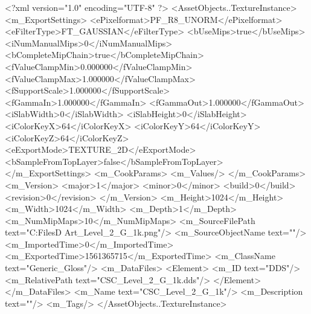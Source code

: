 <?xml version="1.0" encoding="UTF-8" ?>
<AssetObjects..TextureInstance>
	<m_ExportSettings>
		<ePixelformat>PF_R8_UNORM</ePixelformat>
		<eFilterType>FT_GAUSSIAN</eFilterType>
		<bUseMips>true</bUseMips>
		<iNumManualMips>0</iNumManualMips>
		<bCompleteMipChain>true</bCompleteMipChain>
		<fValueClampMin>0.000000</fValueClampMin>
		<fValueClampMax>1.000000</fValueClampMax>
		<fSupportScale>1.000000</fSupportScale>
		<fGammaIn>1.000000</fGammaIn>
		<fGammaOut>1.000000</fGammaOut>
		<iSlabWidth>0</iSlabWidth>
		<iSlabHeight>0</iSlabHeight>
		<iColorKeyX>64</iColorKeyX>
		<iColorKeyY>64</iColorKeyY>
		<iColorKeyZ>64</iColorKeyZ>
		<eExportMode>TEXTURE_2D</eExportMode>
		<bSampleFromTopLayer>false</bSampleFromTopLayer>
	</m_ExportSettings>
	<m_CookParams>
		<m_Values/>
	</m_CookParams>
	<m_Version>
		<major>1</major>
		<minor>0</minor>
		<build>0</build>
		<revision>0</revision>
	</m_Version>
	<m_Height>1024</m_Height>
	<m_Width>1024</m_Width>
	<m_Depth>1</m_Depth>
	<m_NumMipMaps>10</m_NumMipMaps>
	<m_SourceFilePath text="C:\Users\Shadow\Desktop\Working Files\3D Art\CSC_Level_2_G_1k.png"/>
	<m_SourceObjectName text=""/>
	<m_ImportedTime>0</m_ImportedTime>
	<m_ExportedTime>1561365715</m_ExportedTime>
	<m_ClassName text="Generic_Gloss"/>
	<m_DataFiles>
		<Element>
			<m_ID text="DDS"/>
			<m_RelativePath text="CSC_Level_2_G_1k.dds"/>
		</Element>
	</m_DataFiles>
	<m_Name text="CSC_Level_2_G_1k"/>
	<m_Description text=""/>
	<m_Tags/>
</AssetObjects..TextureInstance>

